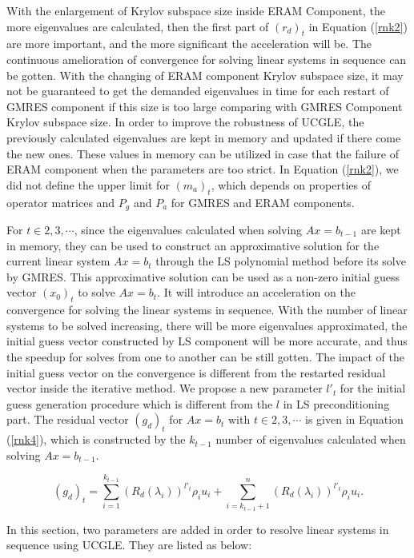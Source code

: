 With the enlargement of Krylov subspace size inside ERAM Component, the more eigenvalues are calculated, then the first part of $(r_d)_t$ in Equation (\ref{rnk2}) are more important, and the more significant the acceleration will be. The continuous amelioration of convergence for solving linear systems in sequence can be gotten. With the changing of ERAM component Krylov subspace size, it may not be guaranteed to get the demanded eigenvalues in time for each restart of GMRES component if this size is too large comparing with GMRES Component Krylov subspace size. In order to improve the robustness of UCGLE, the previously calculated eigenvalues are kept in memory and updated if there come the new ones. These values in memory can be utilized in case that the failure of ERAM component when the parameters are too strict. In Equation (\ref{rnk2}), we did not define the upper limit for $(m_a)_t$, which depends on properties of operator matrices and $P_g$ and $P_a$ for GMRES and ERAM components. 

For $t \in 2,3, \cdots$, since the eigenvalues calculated when solving $Ax = b_{t-1}$ are kept in memory, they can be used to construct an approximative solution for the current linear system $Ax=b_t$ through the LS polynomial method before its solve by GMRES. This approximative solution can be used as a non-zero initial guess vector $(x_0)_t$ to solve $Ax=b_t$. It will introduce an acceleration on the convergence for solving the linear systems in sequence. With the number of linear systems to be solved increasing, there will be more eigenvalues approximated, the initial guess vector constructed by LS component will be more accurate, and thus the speedup for solves from one to another can be still gotten. The impact of the initial guess vector on the convergence is different from the restarted residual vector inside the iterative method. We propose a new parameter $l'_t$ for the initial guess generation procedure which is different from the $l$ in LS preconditioning part. The residual vector $(g_d)_t$ for $Ax=b_t$ with $t \in 2,3, \cdots$ is given in Equation (\ref{rnk4}), which is constructed  by the $k_{t-1}$ number of eigenvalues calculated when solving $Ax=b_{t-1}$.

\begin{equation}
\label{rnk4}
(g_d)_t=\sum_{i=1}^{k_{t-1}}(R_d(\lambda_i))^{l'_t} \rho_i u_i + \sum_{i=k_{t-1}+1}^{n}(R_d(\lambda_i))^{l'_t} \rho_i u_i.
\end{equation}

In this section, two parameters are added in order to resolve linear systems in sequence using UCGLE. They are listed as below:

